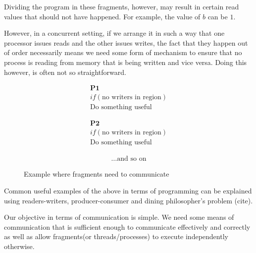     Dividing the program in these fragments, however, may result in certain read values that should not have happened. For example, the value of $b$ can be $1$. 
    
    However, in a concurrent setting, if we arrange it in such a way that one processor issues reads and the other issues writes, the fact that they happen out of order necessarily means we need some form of mechanism to ensure that no process is reading from memory that is being written and vice versa. Doing this however, is often not so straightforward. 
    
    \begin{figure}[hbt!]
        \centering    
        \begin{minipage}[c]{0.35\textwidth}
            \begin{gather*}
                \textbf{P1} \\ if(\text{no writers in region}) \\  \text{Do something useful} 
            \end{gather*}
        \end{minipage}
        \begin{minipage}[c]{0.35\textwidth}
            \begin{gather*}
                \textbf{P2} \\ if(\text{no writers in region}) \\  \text{Do something useful}
            \end{gather*}
        \end{minipage}
        \begin{minipage}[c]{0.2\textwidth}
            \begin{gather*}
                \dots \text{and so on}
            \end{gather*}
        \end{minipage}
    
        \caption{Example where fragments need to communicate}
        \label{fig:my_label}
    \end{figure}
    
    Common useful examples of the above in terms of programming can be explained using readers-writers, producer-consumer and dining philosopher's problem (cite). 
    
    Our objective in terms of communication is simple. We need some means of communication that is sufficient enough to communicate effectively and correctly as well as allow fragments(or threads/processes) to execute independently otherwise. 
    
